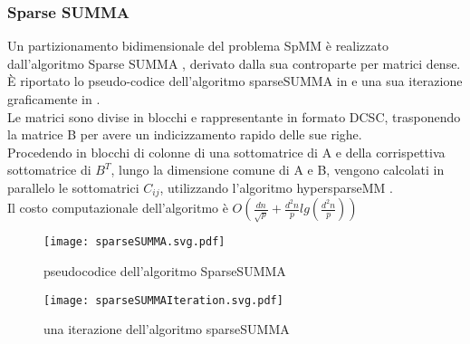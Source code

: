 \subsubsection{Sparse SUMMA}
Un partizionamento bidimensionale del problema SpMM è realizzato
dall'algoritmo Sparse SUMMA , derivato dalla sua
controparte per matrici dense.\\
È riportato lo pseudo-codice dell'algoritmo sparseSUMMA 
in  e una sua iterazione graficamente in
.\\
Le matrici sono divise in blocchi e rappresentante in formato DCSC,
trasponendo la matrice B per avere un indicizzamento rapido delle sue righe.\\
Procedendo in blocchi di colonne di una sottomatrice di A e della corrispettiva
sottomatrice di $B^T$, lungo la dimensione comune di A e B,
vengono calcolati in parallelo le sottomatrici $C_{ij}$, 
utilizzando l'algoritmo hypersparseMM .\\
Il costo computazionale dell'algoritmo è 
$O(\frac{dn}{\sqrt{p}}+\frac{d^2n}{p}lg(\frac{d^2n}{p}))$
\begin{figure}[H]
  \centering \texttt{[image: sparseSUMMA.svg.pdf]} 
  \caption[pseudocodice sparseSUMMA] {pseudocodice dell'algoritmo SparseSUMMA}
  \decoRule \label{figCode:sparseSUMMA}
\end{figure}
\begin{figure}[H]
  \centering \texttt{[image: sparseSUMMAIteration.svg.pdf]}
  \caption[rappresentante sparseSUMMA]{una iterazione dell'algoritmo sparseSUMMA}
  \decoRule \label{fig:sparseSUMMAIteration}
\end{figure}

